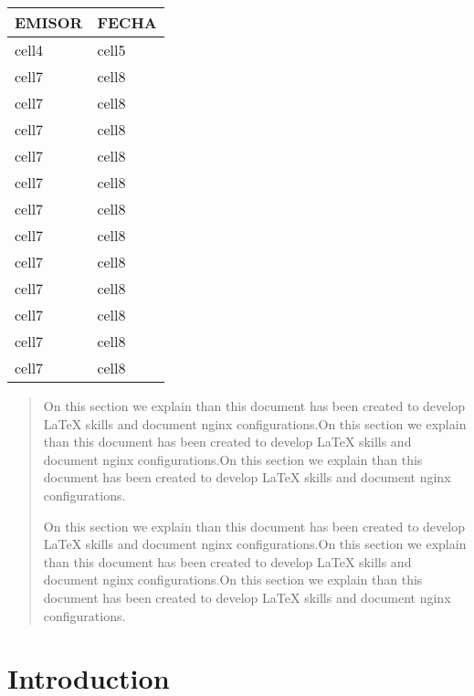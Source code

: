 \documentclass[10pt, a4paper]{article} %
\begin{document}
\begin{tabularx}{0.8\textwidth} { 
    | >{\raggedright\arraybackslash}X 
    | >{\centering\arraybackslash}X | }
    \hline
    EMISOR & FECHA \\ 
    \hline
    cell4 & cell5 \\
    \hline  
    cell7 & cell8 \\ 
    \hline 
    cell7 & cell8 \\ 
    \hline 
    cell7 & cell8 \\ 
    \hline 
    cell7 & cell8 \\ 
    \hline 
    cell7 & cell8 \\ 
    \hline 
    cell7 & cell8 \\ 
    \hline 
    cell7 & cell8 \\ 
    \hline 
    cell7 & cell8 \\ 
    \hline 
    cell7 & cell8 \\ 
    \hline 
    cell7 & cell8 \\ 
    \hline 
    cell7 & cell8 \\ 
    \hline 
    cell7 & cell8 \\ 
    \hline 
  \end{tabularx}

\begin{abstract}
    On this section we explain than this document has been created to develop LaTeX skills and document
    nginx configurations.On this section we explain than this document has been created to develop LaTeX skills and document
    nginx configurations.On this section we explain than this document has been created to develop LaTeX skills and document
    nginx configurations.
    
    On this section we explain than this document has been created to develop LaTeX skills and document
    nginx configurations.On this section we explain than this document has been created to develop LaTeX skills and document
    nginx configurations.On this section we explain than this document has been created to develop LaTeX skills and document
    nginx configurations.
\end{abstract}

\tableofcontents

\section{Introduction} %
\end{document}
